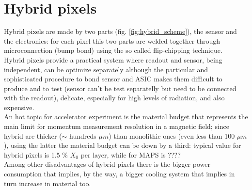 \section{Hybrid pixels}
   Hybrid pixels are made by two parts (fig. \ref{fig:hybrid_scheme}), the sensor and the electronics: for each pixel this two parts are welded together through microconnection (bump bond) using the so called flip-chipping technique.\\  
   Hybrid pixels provide a practical system where readout and sensor, being independent, can be optimize separately although the particular and sophisticated procedure to bond sensor and ASIC makes them difficult to produce and to test (sensor can't be test separatelly but need to be connected with the readout), delicate, especially for high levels of radiation, and also expensive. \\
   An hot topic for accelerator experiment is the material budget that represents the main limit for momentum measurement resolution in a magnetic field; since hybrid are thicker ($\sim$ hundreds $\mu m$) than monolithic ones (even less than 100 $\mu m$), using the latter the material budget can be down by a third: typical value for hybrid pixels is 1.5 \% $X_0$ per layer, while for MAPS is ???? \\
   Among other disadvantages of hybrid pixels there is the bigger power consumption that implies, by the way, a bigger cooling system that implies in turn increase in material too.

